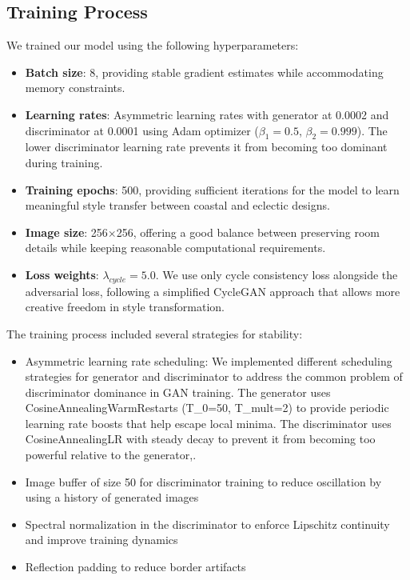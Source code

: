 \documentclass[twocolumn,superscriptaddress,aps]{revtex4-1}
\begin{document}
\subsection{Training Process}

We trained our model using the following hyperparameters:

\begin{itemize}
    \item \textbf{Batch size}: 8, providing stable gradient estimates while accommodating memory constraints.
    
    \item \textbf{Learning rates}: Asymmetric learning rates with generator at 0.0002 and discriminator at 0.0001 using Adam optimizer ($\beta_1=0.5$, $\beta_2=0.999$). The lower discriminator learning rate prevents it from becoming too dominant during training.
    
    \item \textbf{Training epochs}: 500, providing sufficient iterations for the model to learn meaningful style transfer between coastal and eclectic designs.
    
    \item \textbf{Image size}: 256×256, offering a good balance between preserving room details while keeping reasonable computational requirements.
    
    \item \textbf{Loss weights}: $\lambda_{cycle}=5.0$. We use only cycle consistency loss alongside the adversarial loss, following a simplified CycleGAN approach that allows more creative freedom in style transformation.
\end{itemize}

The training process included several strategies for stability:

\begin{itemize}
    \item Asymmetric learning rate scheduling: We implemented different scheduling strategies for generator and discriminator to address the common problem of discriminator dominance in GAN training. The generator uses CosineAnnealingWarmRestarts (T\_0=50, T\_mult=2) to provide periodic learning rate boosts that help escape local minima. The discriminator uses CosineAnnealingLR with steady decay to prevent it from becoming too powerful relative to the generator,.
    \item Image buffer of size 50 for discriminator training to reduce oscillation by using a history of generated images
    \item Spectral normalization in the discriminator to enforce Lipschitz continuity and improve training dynamics
    \item Reflection padding to reduce border artifacts
\end{itemize}
\end{document}
